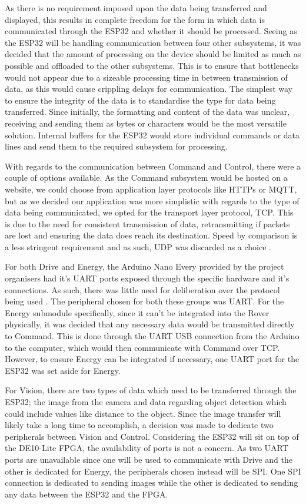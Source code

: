 \documentclass[a4paper]{article}
\begin{document}
As there is no requirement imposed upon the data being transferred 
and displayed, this results in complete freedom for the form in which 
data is communicated through the ESP32 and whether it should be processed. 
Seeing as the ESP32 will be handling communication between four other 
subsystems, it was decided that the amount of processing on the device 
should be limited as much as possible and offloaded to the other 
subsystems. This is to ensure that bottlenecks would not appear due to a 
sizeable processing time in between transmission of data, as this would 
cause crippling delays for communication. The simplest way to ensure the 
integrity of the data is to standardise the type for data being 
transferred. Since initially, the formatting and content of the data was 
unclear, receiving and sending them as bytes or characters would be the 
most versatile solution. Internal buffers for the ESP32 would store 
individual commands or data lines and send them to the required subsystem 
for processing.

With regards to the communication between Command and Control, 
there were a couple of options available. As the Command subsystem 
would be hosted on a website, we could choose from application layer 
protocols like HTTPs or MQTT, but as we decided our application was 
more simplistic with regards to the type of data being communicated, we 
opted for the transport layer protocol, TCP. This is due to the need for 
consistent transmission of data, retransmitting if packets are lost and 
ensuring the data does reach its destination. Speed by comparison is a 
less stringent requirement and as such, UDP was discarded as a choice
\cite{TCPvsUDP}.

For both Drive and Energy, the Arduino Nano Every provided by the 
project organisers had it’s UART ports exposed through the specific 
hardware and it’s connections. As such, there was little need for 
deliberation over the protocol being used \cite{ArduinoSerial}. The 
peripheral chosen for both these groups was UART. For the Energy 
submodule specifically, since it can’t be integrated into the Rover 
physically, it was decided that any necessary data would be transmitted 
directly to Command. This is done through the UART USB connection from the 
Arduino to the computer, which would then communicate with Command over 
TCP. However, to ensure Energy can be integrated if necessary, one UART 
port for the ESP32 was set aside for Energy.

For Vision, there are two types of data which need to be transferred 
through the ESP32; the image from the camera and data regarding object 
detection which could include values like distance to the object. Since 
the image transfer will likely take a long time to accomplish, a decision
was made to dedicate two peripherals between Vision and Control. 
Considering the ESP32 will sit on top of the DE10-Lite FPGA, the 
availability of ports is not a concern. As two UART ports are unavailable 
since one will be used to communicate with Drive and the other is 
dedicated for Energy, the peripherals chosen instead will be SPI. 
One SPI connection is dedicated to sending images while the other is 
dedicated to sending any data between the ESP32 and the FPGA.
\end{document}
